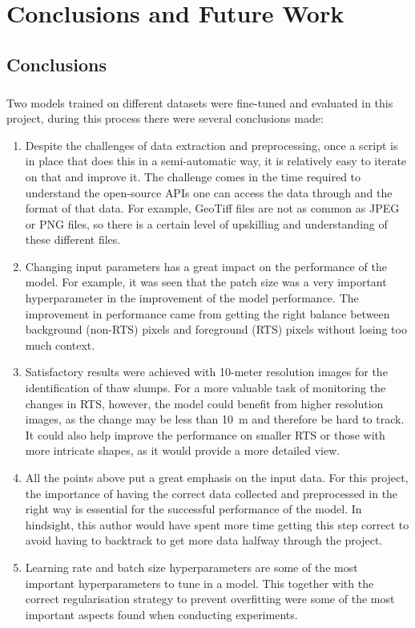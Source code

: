 \chapter{Conclusions and Future Work}
\section{Conclusions}
\paragraph{}
Two models trained on different datasets were fine-tuned and evaluated in this project, during this process there were several conclusions made:
\begin{enumerate}
    \item{Despite the challenges of data extraction and preprocessing, once a script is in place that does this in a semi-automatic way, it is relatively easy to iterate on that and improve it. The challenge comes in the time required to understand the open-source \gls{API}s one can access the data through and the format of that data. For example, GeoTiff files are not as common as JPEG or PNG files, so there is a certain level of upskilling and understanding of these different files.}
    
    \item{Changing input parameters has a great impact on the performance of the model. For example, it was seen that the patch size was a very important hyperparameter in the improvement of the model performance. The improvement in performance came from getting the right balance between background (non-\gls{RTS}) pixels and foreground (\gls{RTS}) pixels without losing too much context.}
    
    \item{Satisfactory results were achieved with 10-meter resolution images for the identification of thaw slumps. For a more valuable task of monitoring the changes in \gls{RTS}, however, the model could benefit from higher resolution images, as the change may be less than \SI{10}{\metre} and therefore be hard to track. It could also help improve the performance on smaller \gls{RTS} or those with more intricate shapes, as it would provide a more detailed view.}
    
    \item{All the points above put a great emphasis on the input data. For this project, the importance of having the correct data collected and preprocessed in the right way is essential for the successful performance of the model. In hindsight, this author would have spent more time getting this step correct to avoid having to backtrack to get more data halfway through the project.}
    
    \item{Learning rate and batch size hyperparameters are some of the most important hyperparameters to tune in a model. This together with the correct regularisation strategy to prevent overfitting were some of the most important aspects found when conducting experiments.}
\end{enumerate}

